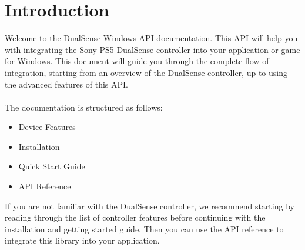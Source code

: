 \section{Introduction}
Welcome to the DualSense Windows API documentation. This API will help you with integrating the Sony PS5 DualSense controller into your application or game for Windows. This document will guide you through the complete flow of integration, starting from an overview of the DualSense controller, up to using the advanced features of this API.\\
\\
The documentation is structured as follows:
\begin{itemize}
	\item Device Features
	\item Installation
	\item Quick Start Guide
	\item API Reference
\end{itemize}

If you are not familiar with the DualSense controller, we recommend starting by reading through the list of controller features before continuing with the installation and getting started guide. Then you can use the API reference to integrate this library into your application.

\newpage